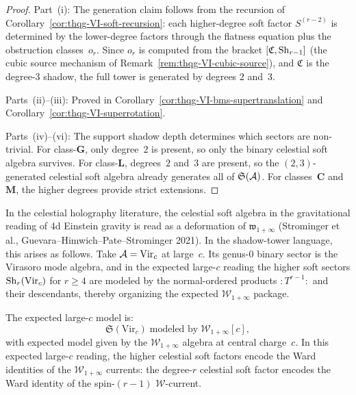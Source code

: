 \begin{proof}
Part~(i): The generation claim follows from the recursion of
Corollary~\ref{cor:thqg-VI-soft-recursion}: each higher-degree
soft factor $S^{(r-2)}$ is determined by the lower-degree factors
through the flatness equation plus the obstruction
classes~$o_r$. Since $o_r$ is computed from the bracket
$[\mathfrak{C}, \operatorname{Sh}_{r-1}]$ (the cubic source mechanism of
Remark~\ref{rem:thqg-VI-cubic-source}), and $\mathfrak{C}$ is
the degree-$3$ shadow, the full tower is generated by degrees $2$
and~$3$.

Parts~(ii)--(iii): Proved in
Corollary~\ref{cor:thqg-VI-bms-supertranslation} and
Corollary~\ref{cor:thqg-VI-superrotation}.

Parts~(iv)--(vi): The support shadow depth determines which sectors are
non-trivial. For class-$\mathbf{G}$, only degree~$2$ is present,
so only the binary celestial soft algebra survives. For
class-$\mathbf{L}$, degrees~$2$ and~$3$ are present, so the
$(2,3)$-generated celestial soft algebra already generates all of
$\mathfrak{S}(\mathcal{A})$. For classes~$\mathbf{C}$ and~$\mathbf{M}$,
the higher degrees provide strict extensions.
\end{proof}

\begin{remark}
\label{rem:thqg-VI-w-infinity}
In the celestial holography literature, the celestial soft algebra in
the gravitational reading of 4d Einstein gravity is read as a deformation of
$\mathfrak{w}_{1+\infty}$ (Strominger et al.,
Guevara--Himwich--Pate--Strominger 2021). In the shadow-tower
language, this arises as follows. Take $\mathcal{A} = \mathrm{Vir}_c$
at large~$c$. Its genus-$0$ binary sector is the Virasoro
mode algebra, and in the expected large-$c$ reading the higher soft
sectors $\operatorname{Sh}_r(\mathrm{Vir}_c)$ for $r \geq 4$ are modeled by the
normal-ordered products $:T^{r-1}:$ and their descendants, thereby
organizing the expected $\mathcal{W}_{1+\infty}$ package.

The expected large-$c$ model is:
\begin{equation}%
\mathfrak{S}(\mathrm{Vir}_c)
\;\text{modeled by}\;
\mathcal{W}_{1+\infty}[c],
\end{equation}
with expected model given by the $\mathcal{W}_{1+\infty}$ algebra at
central charge~$c$.
In this expected large-$c$ reading, the higher celestial soft
factors encode the Ward identities of the
$\mathcal{W}_{1+\infty}$ currents: the degree-$r$ celestial soft
factor encodes the Ward identity of the spin-$(r-1)$
$\mathcal{W}$-current.
\end{remark}

